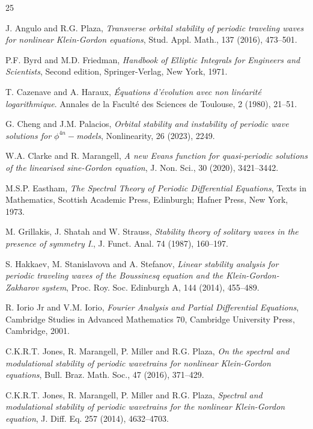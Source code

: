 \documentclass[12pt,reqno,a4paper]{amsart} %
\numberwithin{equation}{section}
\numberwithin{figure}{section}
\begin{document}
\begin{thebibliography}{25}

 J. Angulo and R.G. Plaza, \textit{Transverse orbital stability of periodic traveling waves for nonlinear Klein-Gordon equations}, Stud. Appl. Math., 137 (2016), 473--501.

 P.F. Byrd and M.D. Friedman, \textit{Handbook of Elliptic Integrals
	for Engineers and Scientists}, Second edition, Springer-Verlag, New York, 1971.
	
 T. Cazenave and A. Haraux, \textit{Équations d'évolution avec non linéarité logarithmique}. 
Annales de la Faculté des Sciences de Toulouse, 2 (1980), 21--51. 

 G. Cheng and J.M. Palacios, \textit{Orbital stability and instability of periodic wave solutions for $\phi^{4n}-$models}, Nonlinearity, 26 (2023), 2249.

 W.A. Clarke and R. Marangell, \textit{A new Evans function for quasi-periodic solutions of the linearised sine-Gordon equation}, J. Non. Sci., 30 (2020), 3421--3442.

 M.S.P. Eastham, \textit{The Spectral Theory of Periodic Differential Equations}, Texts in Mathematics, Scottish Academic Press, Edinburgh; Hafner Press, New York, 1973. 

 M. Grillakis, J. Shatah and W. Strauss, \textit{ Stability theory of solitary waves in the presence of symmetry
I}., J. Funct. Anal. 74 (1987), 160--197.

 S. Hakkaev, M. Stanislavova and A. Stefanov, \textit{Linear stability analysis for periodic traveling waves of the Boussinesq equation and the Klein-Gordon-Zakharov system}, Proc. Roy. Soc. Edinburgh A, 144 (2014), 455--489.

 R. Iorio Jr and V.M. Iorio, \textit{Fourier Analysis and Partial Differential Equations}, Cambridge Studies in Advanced Mathematics 70, Cambridge University Press, Cambridge, 2001.

  C.K.R.T. Jones, R. Marangell, P. Miller and R.G. Plaza, \textit{On the spectral and modulational
	stability of periodic wavetrains for nonlinear Klein-Gordon equations}, Bull. Braz. Math. Soc., 47 (2016), 371--429.

   C.K.R.T. Jones, R. Marangell, P. Miller and R.G. Plaza, \textit{Spectral and modulational stability of
	periodic wavetrains for the nonlinear Klein-Gordon equation}, J. Diff. Eq. 257 (2014), 4632--4703.


\end{thebibliography}
\end{document}
